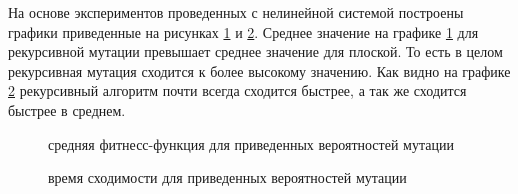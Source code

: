 \documentclass[utf8,usehyperref,12pt]{G7-32}
\begin{document}
На основе экспериментов проведенных с нелинейной системой построены графики приведенные на рисунках \ref{mutate_diff_fit_nl} и \ref{mutate_diff_gen_nl}. Среднее значение на графике \ref{mutate_diff_fit_nl} для рекурсивной мутации превышает среднее значение для плоской. То есть в целом рекурсивная мутация сходится к более высокому значению. Как видно на графике \ref{mutate_diff_gen_nl} рекурсивный алгоритм почти всегда сходится быстрее, а так же сходится быстрее в среднем.
\begin{figure}[H]
 \caption{средняя фитнесс-функция для приведенных вероятностей мутации}\label{mutate_diff_fit_nl}
\end{figure}
\begin{figure}[H]
 \caption{время сходимости для приведенных вероятностей мутации}\label{mutate_diff_gen_nl}
\end{figure}


\end{document}
